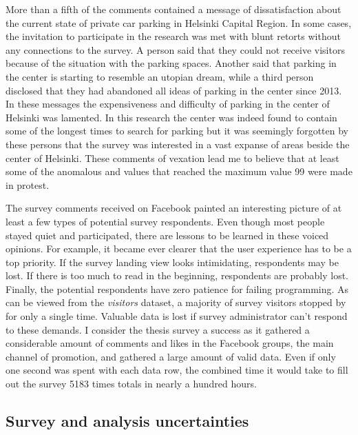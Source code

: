 More than a fifth of the comments contained a message of dissatisfaction about the current state of private car parking in Helsinki Capital Region. In some cases, the invitation to participate in the research was met with blunt retorts without any connections to the survey. A person said that they could not receive visitors because of the situation with the parking spaces. Another said that parking in the center is starting to resemble an utopian dream, while a third person disclosed that they had abandoned all ideas of parking in the center since 2013. In these messages the expensiveness and difficulty of parking in the center of Helsinki was lamented. In this research the center was indeed found to contain some of the longest times to search for parking but it was seemingly forgotten by these persons that the survey was interested in a vast expanse of areas beside the center of Helsinki. These comments of vexation lead me to believe that at least some of the anomalous  and  values that reached the maximum value 99 were made in protest.

The survey comments received on Facebook painted an interesting picture of at least a few types of potential survey respondents. Even though most people stayed quiet and participated, there are lessons to be learned in these voiced opinions. For example, it became ever clearer that the user experience has to be a top priority. If the survey landing view looks intimidating, respondents may be lost. If there is too much to read in the beginning, respondents are probably lost. Finally, the potential respondents have zero patience for failing programming. As can be viewed from the \textit{visitors} dataset, a majority of survey visitors stopped by for only a single time. Valuable data is lost if survey administrator can't respond to these demands. I consider the thesis survey a success as it gathered a considerable amount of comments and likes in the Facebook groups, the main channel of promotion, and gathered a large amount of valid data. Even if only one second was spent with each data row, the combined time it would take to fill out the survey 5183 times totals in nearly a hundred hours.

\newpage
\subsection{Survey and analysis uncertainties}
\justify


